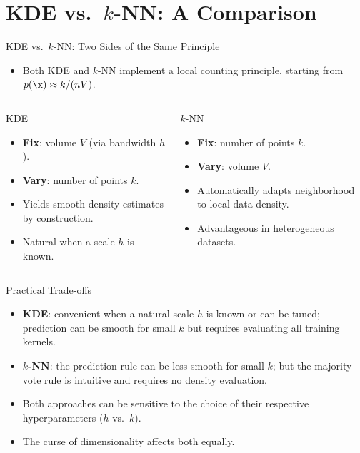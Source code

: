 \section{KDE vs.\ $k$-NN: A Comparison}

\begin{frame}{KDE vs.\ $k$-NN: Two Sides of the Same Principle}
  \begin{itemize}
    \item Both KDE and $k$-NN implement a \alert{local counting principle}, starting from $p(\x) \approx k/(nV)$.
  \end{itemize}
  \vspace{0.4em}
  \begin{columns}[t]
      \begin{block}{KDE}
        \begin{itemize}
          \item \textbf{Fix}: volume $V$ (via bandwidth $h$).
          \item \textbf{Vary}: number of points $k$.
          \item Yields smooth density estimates by construction.
          \item Natural when a scale $h$ is known.
        \end{itemize}
      \end{block}
      \begin{block}{$k$-NN}
        \begin{itemize}
          \item \textbf{Fix}: number of points $k$.
          \item \textbf{Vary}: volume $V$.
          \item Automatically adapts neighborhood to local data density.
          \item Advantageous in heterogeneous datasets.
        \end{itemize}
      \end{block}
  \end{columns}
\end{frame}

\begin{frame}{Practical Trade-offs}
  \begin{itemize}
    \item \textbf{KDE}: convenient when a natural scale $h$ is known or can be tuned; prediction can be smooth for small $k$ but requires evaluating all training kernels.
    \item \textbf{$k$-NN}: the prediction rule can be less smooth for small $k$; but the majority vote rule is intuitive and requires no density evaluation.
    \item Both approaches can be sensitive to the choice of their respective hyperparameters ($h$ vs.\ $k$).
    \item The \alert{curse of dimensionality} affects both equally.
  \end{itemize}
\end{frame}

